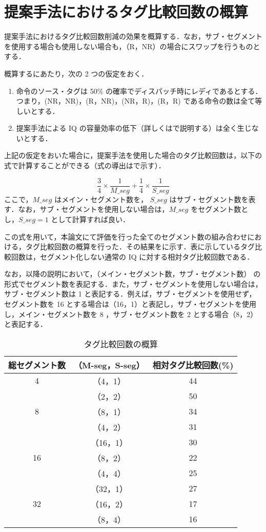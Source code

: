 \section{提案手法におけるタグ比較回数の概算}
\label{sec:comp_estimate}
提案手法におけるタグ比較回数削減の効果を概算する．なお，サブ・セグメントを使用する場合も使用しない場合も，（R，NR）の場合にスワップを行うものとする．

概算するにあたり，次の 2 つの仮定をおく．
\begin{enumerate}
  \item 命令のソース・タグは 50\% の確率でディスパッチ時にレディであるとする．つまり，(NR，NR)，(R，NR)，(NR，R)，(R，R) である命令の数は全て等しいとする．
  \item 提案手法による IQ の容量効率の低下（詳しくはで説明する）は全く生じないとする．
\end{enumerate}
上記の仮定をおいた場合に，提案手法を使用した場合のタグ比較回数は，以下の式で計算することができる（式の導出はで示す）．

\[
  \frac{3}{4}\times\frac{1}{M\_seg} + \frac{1}{4}\times\frac{1}{S\_seg}
\]
ここで，$M\_seg$ はメイン・セグメント数を， $S\_seg$ はサブ・セグメント数を表す．なお，サブ・セグメントを使用しない場合は，$M\_seg$ をセグメント数とし，$S\_seg = 1 $ として計算すれば良い．

この式を用いて，本論文にて評価を行った全てのセグメント数の組み合わせにおける，タグ比較回数の概算を行った．その結果をに示す．表に示しているタグ比較回数は，セグメント化しない通常の IQ に対する相対タグ比較回数である．

なお，以降の説明において，（メイン・セグメント数，サブ・セグメント数） の形式でセグメント数を表記する．また，サブ・セグメントを使用しない場合は，サブ・セグメント数は 1 と表記する．例えば，サブ・セグメントを使用せず，セグメント数を 16 とする場合は（16，1）と表記し，サブ・セグメントを使用し，メイン・セグメント数を 8 ，サブ・セグメント数を 2 とする場合（8，2）と表記する．

\begin{table}[htb]
  \caption{タグ比較回数の概算}
  \footnotesize
  \center
    \begin{tabular}{c|c|c} \hline \hline
    総セグメント数 & （M-seg，S-seg） & 相対タグ比較回数(\%) \\ \hline
    4 &（4，1） & 44 \\
    &（2，2） & 50 \\ \hline
    8 &（8，1） & 34 \\
    &（4，2） & 31 \\ \hline
    &（16，1） & 30 \\
    16 &（8，2） & 22 \\
    &（4，4） & 25 \\ \hline
    &（32，1） & 27 \\
    32 &（16，2） & 17 \\
    &（8，4） & 16 \\ \hline
  \end{tabular}
  \label{tab:comp_estimate}
\end{table}

